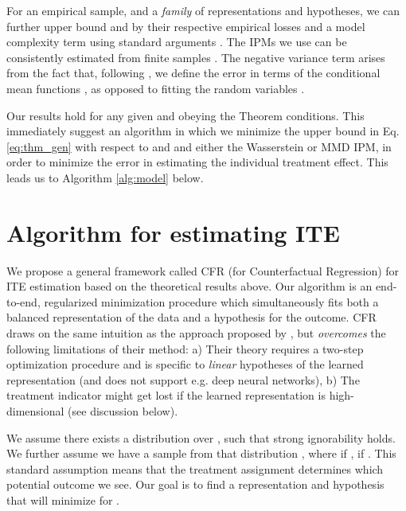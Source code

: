 \documentclass{article}
\begin{document}
For an empirical sample, and a \emph{family} of representations and hypotheses, we can further upper bound  and  by their respective empirical losses and a model complexity term using standard arguments \citep{shalev2014understanding}. The IPMs we use can be consistently estimated from finite samples \citep{sriperumbudur2012empirical}. The negative variance term  arises from the fact that, following \citet{hill2011bayesian,athey2016recursive}, we define the error  in terms of the conditional mean functions , as opposed to fitting the random variables .

Our results hold for any given  and  obeying the Theorem conditions. This immediately suggest an algorithm in which we minimize the upper bound in Eq. \eqref{eq:thm_gen} with respect to  and  and either the Wasserstein or MMD IPM, in order to minimize the error in estimating the individual treatment effect. This leads us to Algorithm \ref{alg:model} below.
 
\section{Algorithm for estimating ITE}\label{sec:model}

We propose a general framework called CFR (for Counterfactual Regression) for ITE estimation based on the theoretical results above. Our algorithm is an end-to-end, regularized minimization procedure which simultaneously fits both a balanced representation of the data and a hypothesis for the outcome.
CFR draws on the same intuition as the approach proposed by  \citet{johansson2016counterfactual}, but \emph{overcomes} the following limitations of their method: a) Their theory requires a two-step optimization procedure and is specific to \emph{linear} hypotheses of the learned representation (and does not support e.g. deep neural networks), b) The treatment indicator might get lost if the learned representation is high-dimensional (see discussion below).



We assume there exists a distribution  over , such that strong ignorability holds. We further assume we have a sample from that distribution , where  if ,  if . This standard assumption means that the treatment assignment determines which potential outcome we see. Our goal is to find a representation  and hypothesis  that will minimize  for .
\end{document}
